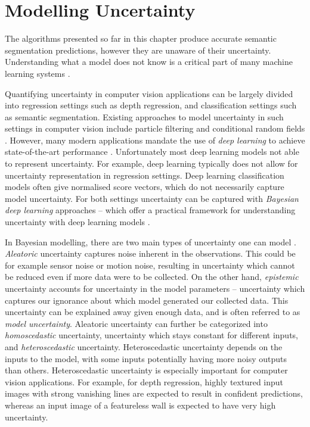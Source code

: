 \section{Modelling Uncertainty}
\label{seg_unc}

The algorithms presented so far in this chapter produce accurate semantic segmentation predictions, however they are unaware of their uncertainty. Understanding what a model does not know is a critical part of many machine learning systems \citep{ghahramani2015probabilistic}.

Quantifying uncertainty in computer vision applications can be largely divided into regression settings such as depth regression, and classification settings such as semantic segmentation.
Existing approaches to model uncertainty in such settings in computer vision include particle filtering and conditional random fields \citep{blake1993framework, he2004multiscale}. However, many modern applications mandate the use of \textit{deep learning} to achieve state-of-the-art performance \citep{he2016deep}. Unfortunately most deep learning models not able to represent uncertainty.
For example, deep learning typically does not allow for uncertainty representation in regression settings. Deep learning classification models often give normalised score vectors, which do not necessarily capture model uncertainty. For both settings uncertainty can be captured with \textit{Bayesian deep learning} \citep{denker1991transforming, mackay1992practical, neal1995bayesian} approaches --
which offer a practical framework for understanding uncertainty with deep learning models 
\citep{gal2016thesis}.

In Bayesian modelling, there are two main types of uncertainty one can model \citep{der2009aleatory}. \textit{Aleatoric} uncertainty captures noise inherent in the observations.
This could be for example sensor noise or motion noise, resulting in uncertainty which cannot be reduced even if more data were to be collected.
On the other hand, \textit{epistemic} uncertainty accounts for uncertainty in the model parameters -- uncertainty which captures our ignorance about which model generated our collected data. 
This uncertainty can be explained away given enough data, and is often referred to as \textit{model uncertainty}. Aleatoric uncertainty can further be categorized into \textit{homoscedastic} uncertainty, uncertainty which stays constant for different inputs, and \textit{heteroscedastic} uncertainty. Heteroscedastic uncertainty depends on the inputs to the model, with some inputs potentially having more noisy outputs than others. 
Heteroscedastic uncertainty is especially important for computer vision applications. For example, for depth regression, highly textured input images with strong vanishing lines are expected to result in confident predictions, whereas an input image of a featureless wall is expected to have very high uncertainty.

